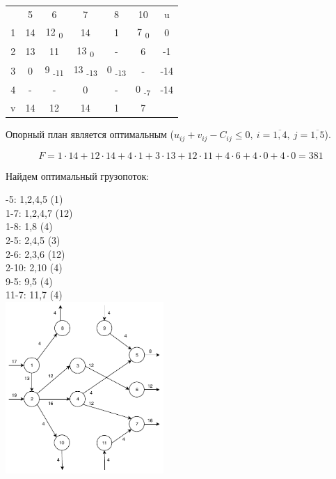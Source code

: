 \documentclass[listings]{labreport}
\begin{document}
{\renewcommand{\arraystretch}{1.4}
\begin{tabular}{c|c|c|c|c|c|c}
\multicolumn{1}{c}{} &
  \multicolumn{1}{c}{5} &
  \multicolumn{1}{c}{6} &
  \multicolumn{1}{c}{7} &
  \multicolumn{1}{c}{8} &
  \multicolumn{1}{c}{10} &
  \multicolumn{1}{c}{u} \\ \cline{2-6}
1 & 14 & 12 \textsubscript{0} & 14 & 1 & 7 \textsubscript{0} & 0 \\ \cline{2-6}
2 & 13 & 11 & 13 \textsubscript{0} & - & 6 & -1 \\ \cline{2-6}
3 & 0 & 9 \textsubscript{-11} & 13 \textsubscript{-13} & 0 \textsubscript{-13} & - & -14 \\ \cline{2-6}
4 & - & - & 0 & - & 0 \textsubscript{-7} & -14 \\ \cline{2-6}
\multicolumn{1}{c}{v} &
  \multicolumn{1}{c}{14} &
  \multicolumn{1}{c}{12} &
  \multicolumn{1}{c}{14} &
  \multicolumn{1}{c}{1} &
  \multicolumn{1}{c}{7} \\
\end{tabular}}

Опорный план является оптимальным ($u_{ij} + v_{ij} - C_{ij} \leqslant 0,\ i = \overline{1,4},\ j = \overline{1,5}$).

$$F = 1\cdot14 + 12\cdot14 + 4\cdot1 + 3\cdot13 + 12\cdot11 + 4\cdot6 + 4\cdot0 + 4\cdot0 = 381$$

\newpage

Найдем оптимальный грузопоток:

\begin{multicols}{2}

-5: 1,2,4,5 (1) \\
1-7: 1,2,4,7 (12) \\
1-8: 1,8 (4) \\
2-5: 2,4,5 (3) \\
2-6: 2,3,6 (12) \\
2-10: 2,10 (4) \\
9-5: 9,5 (4) \\
11-7: 11,7 (4) \\

\includegraphics[width=0.45\textwidth]{graph2.pdf}
\end{multicols}
\end{document}
